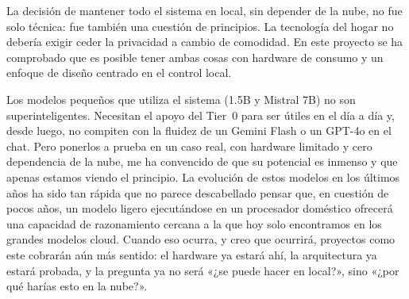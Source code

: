 La decisión de mantener todo el sistema en local, sin depender de la nube, no fue solo técnica: fue también una cuestión de principios. La tecnología del hogar no debería exigir ceder la privacidad a cambio de comodidad. En este proyecto se ha comprobado que es posible tener ambas cosas con hardware de consumo y un enfoque de diseño centrado en el control local.

Los modelos pequeños que utiliza el sistema (1.5B y Mistral 7B) no son superinteligentes. Necesitan el apoyo del Tier~0 para ser útiles en el día a día y, desde luego, no compiten con la fluidez de un Gemini Flash o un GPT-4o en el chat. Pero ponerlos a prueba en un caso real, con hardware limitado y cero dependencia de la nube, me ha convencido de que su potencial es inmenso y que apenas estamos viendo el principio. La evolución de estos modelos en los últimos años ha sido tan rápida que no parece descabellado pensar que, en cuestión de pocos años, un modelo ligero ejecutándose en un procesador doméstico ofrecerá una capacidad de razonamiento cercana a la que hoy solo encontramos en los grandes modelos cloud. Cuando eso ocurra, y creo que ocurrirá, proyectos como este cobrarán aún más sentido: el hardware ya estará ahí, la arquitectura ya estará probada, y la pregunta ya no será «¿se puede hacer en local?», sino «¿por qué harías esto en la nube?».
